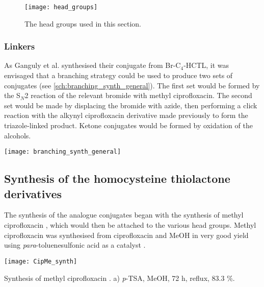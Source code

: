 \begin{figure}[H]
	\begin{center}
		\texttt{[image: head\_groups]}
		\caption{The head groups used in this section.\label{fig:head_groups}}
	\end{center}
\end{figure}

\subsubsection{Linkers}

As Ganguly et al.\cite{Ganguly2001} synthesised their conjugate from Br-C$_4$-HCTL, it was envisaged that a branching strategy could be used to produce two sets of conjugates (see \ref{sch:branching_synth_general}). The first set would be formed by the S$_N$2 reaction of the relevant bromide with methyl ciprofloxacin. The second set would be made by displacing the bromide with azide, then performing a click reaction with the alkynyl ciprofloxacin derivative  made previously to form the triazole-linked product. Ketone conjugates would be formed by oxidation of the alcohols.

\begin{scheme}[H]
	\begin{center}
		\texttt{[image: branching\_synth\_general]}
		\caption{\label{sch:branching_synth_general}}
	\end{center}
\end{scheme}

\subsection{Synthesis of the homocysteine thiolactone derivatives\label{sec:HCTL}}

The synthesis of the analogue conjugates began with the synthesis of methyl ciprofloxacin , which would then be attached to the various head groups.
Methyl ciprofloxacin  was synthesised from ciprofloxacin  and MeOH in very good yield using \textit{para}-toluenesulfonic acid as a catalyst \cite{Sachin2010}.

\begin{scheme}[H]
	\begin{center}
		\texttt{[image: CipMe\_synth]}
		\caption{Synthesis of methyl ciprofloxacin . a) \textit{p}-TSA, MeOH, 72 h, reflux, 83.3 \%. \label{sch:CipMe_synth}}
	\end{center}
\end{scheme}

